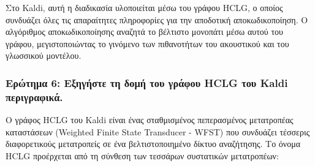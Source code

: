 \documentclass[a4paper,12pt]{article}
\begin{document}
Στο Kaldi, αυτή η διαδικασία υλοποιείται μέσω του γράφου HCLG, ο οποίος συνδυάζει όλες τις απαραίτητες πληροφορίες για την αποδοτική αποκωδικοποίηση. Ο αλγόριθμος αποκωδικοποίησης αναζητά το βέλτιστο μονοπάτι μέσω αυτού του γράφου, μεγιστοποιώντας το γινόμενο των πιθανοτήτων του ακουστικού και του γλωσσικού μοντέλου.

\subsubsection*{Ερώτημα 6: Εξηγήστε τη δομή του γράφου HCLG του Kaldi περιγραφικά.}

Ο γράφος HCLG του Kaldi είναι ένας σταθμισμένος πεπερασμένος μετατροπέας καταστάσεων (Weighted Finite State Transducer - WFST) που συνδυάζει τέσσερις διαφορετικούς μετατροπείς σε ένα βελτιστοποιημένο δίκτυο αναζήτησης. Το όνομα HCLG προέρχεται από τη σύνθεση των τεσσάρων συστατικών μετατροπέων:
\end{document}
